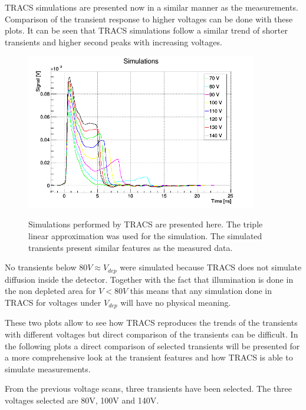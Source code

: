 TRACS simulations are presented now in a similar manner as the measurements. Comparison of the transient response to higher voltages can be done with these plots. It can be seen that TRACS simulations follow a similar trend of shorter transients and higher second peaks with increasing voltages.

\begin{figure}[H]
	\centering
	\centering
	\includegraphics[width=0.9\textwidth]{AllSims.png}
	\label{fig:mues2}
	\caption{Simulations performed by TRACS are presented here. The triple linear approximation was used for the simulation. The simulated transients present similar features as the measured data.}
\end{figure}

No transients below $80V \approx V_{dep}$ were simulated because TRACS does not simulate diffusion inside the detector. Together with the fact that illumination is done in the non depleted area for $V < 80V$ this means that any simulation done in TRACS for voltages under $V_{dep}$ will have no physical meaning.

These two plots allow to see how TRACS reproduces the trends of the transients with different voltages but direct comparison of the transients can be difficult. In the following plots a direct comparison of selected transients will be presented for a more comprehensive look at the transient features and how TRACS is able to simulate measurements.

From the previous voltage scans, three transients have been selected. The three voltages selected are 80V, 100V and 140V. 

